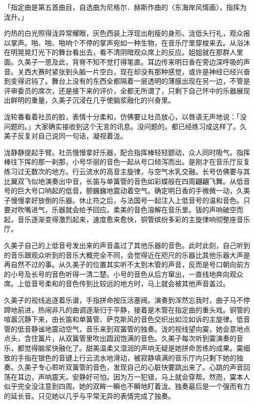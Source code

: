 \documentclass[UTF8]{ctexart}
\begin{document}
    「指定曲是第五首曲目，自选曲为尼格尔．赫斯作曲的〈东海岸风情画〉，指挥为泷升。」 

    灼热的白光照得泷异常耀眼，灰色西装上浮现出削瘦的身形。泷低头行礼，观众报以掌声。啪、啪、啪响个不停的掌声宛如一种生物，在音乐厅里穿梭来去。从浴沐在明晃晃灯光下的舞台看出去，看不清阴暗观众席上的反应。姐姐就在那群人里面。久美子一思及此，背脊不知不觉打得笔直。耳边传来明日香在旁边深呼吸的声音。关西大赛时紧张到头脑一片空白，现在却没有那种感觉，或许是神经已经兴奋到变得迟钝了。舞台上没有的东西全都隔着一层透明的薄膜出现在另一边，不管是评审委员的席次，还是接下来的评价，全都无所谓了，只剩下自己怀中的乐器展现出鲜明的重量，久美子沉浸在几乎使脑浆融化的兴奋里。 

    泷轮番看着社员的脸，表情十分柔和，仿佛要让社员放心，以唇语无声地说：「没问题的。」大家确实接收到这个无言的讯息。没问题的。都已经练习成这样了。久美子反复对自己说同一句话，凝视着泷。 

    泷静静提起手臂。社员慢慢拿好乐器，配合指挥棒轻轻颤动，众人同时吸气。指挥棒往下挥的那一刹那，小号华丽的音色一起从号口倾泻而出。是刚才在音乐厅反复练习过无数次的地方。行云流水的高音主旋律，与空气水乳交融。长号仿佛要与其比翼双飞似地演奏出中音，长笛与单簧管的音色如彩蝶般在四周翩翩飞舞。从低音号的巨大号口响起的低音，颤巍巍地震动着空气。确定明日香的手微微一动，久美子慢慢拿好放倒的乐器。休止符之后，与法国号一起注入上低音号的温和音色。只要对吹嘴进气，乐器就会给予回应。柔美的音色溶解在音乐里。钹的声响破空而起，音乐逐渐变得激烈起来，速度愈来愈快，铜管缤纷多彩的主旋律响彻整座音乐厅。 

    久美子自己的上低音号发出来的声音盖过了其他乐器的音色。此时此刻，自己听到的音乐跟观众听到的音乐大概完全不同，会觉得近在咫尺的乐器比其他乐器大声是再自然不过的事。从久美子的位置其实听不太到木管的声音，反而是号口朝向前方的小号及长号的音色听得一清二楚。小号的音色从后方窜出，一直线地奔向观众席。上低音号柔和的音色传到比较远的地方时，马上就会被其他声音盖过。 

    久美子的视线追逐着乐谱，手指拼命按压活塞阀。演奏到浑然忘我时，曲子马不停蹄地前进，热闹非凡的曲调逐渐归于平静，接着是木管在指定曲的重头戏。铜管的喧嚣沉静下来，由长笛和单簧管、萨克斯风的音色交织出如泣如诉的主旋律。低音管的低音静谧地震动空气，音乐来到双簧管的独奏。泷的视线望向霙，她会意地点点头，含住簧片，从双簧管里吹出圆润饱满的音色。久美子每次听到霙演奏的音乐，都觉得脑浆快融化了。甜美温柔又湿润的声响无疑是她拼命苦练的成果。霙细致的手指在银色的音键上行云流水地滑动，被寂静填满的音乐厅内只剩下她的独奏。久美子专心聆听双簧管的音色，发现自己的心脏快要跳出来了。心跳的声音回荡在耳边，声响震天。安静好可怕。因为万一犯错，马上就会穿帮。然而，霙本人似乎完全没注意到四周。她的双眸一瞬也不瞬地盯着泷。独奏最后是一个强而有力的延长音。只见她以几乎与平常无异的表情完成了独奏。 
\end{document}
